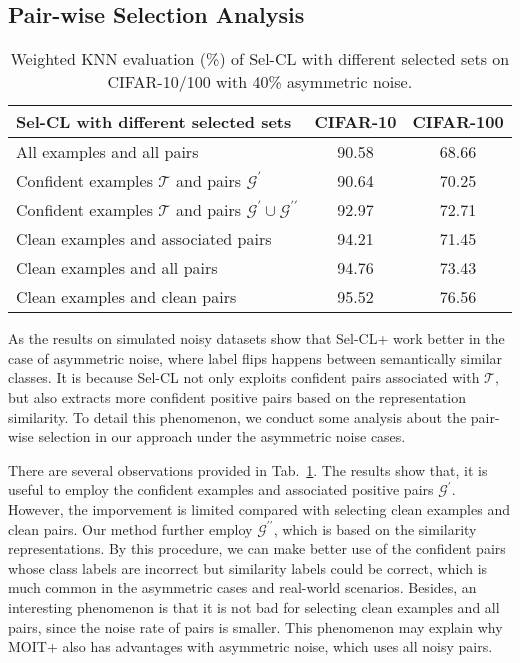 \documentclass[10pt,twocolumn,letterpaper]{article}
\begin{document}
\subsection{Pair-wise Selection Analysis}\label{sec:4.4}

\begin{table}[t]
	\caption{Weighted KNN evaluation (\%) of Sel-CL with different selected sets on CIFAR-10/100 with 40\% asymmetric noise. }
	\centering
	\footnotesize
	\setlength\tabcolsep{4pt}
	\begin{tabular}{l|c|c}
		\hline
		Sel-CL with different selected sets & CIFAR-10 & CIFAR-100 \\
		\hline  { All examples and all pairs}  & 90.58 & 68.66 \\
		\hline
		{ Confident examples $\mathcal{T}$ and pairs $\mathcal{G}^{\prime}$ }  & 90.64 & 70.25 \\
		{ Confident examples $\mathcal{T}$ and pairs $\mathcal{G}^{\prime} \cup \mathcal{G}^{\prime\prime}$ }  & 92.97 & 72.71 \\
		\hline
		{ Clean examples and associated pairs }  & 94.21 & 71.45 \\
		{ Clean examples and all pairs }    & 94.76 & 73.43 \\		
		{ Clean examples and clean pairs }  & 95.52 & 76.56\\
		\hline
	\end{tabular}
	\label{select}
	\vspace{-5pt}
\end{table}

As the results on simulated noisy datasets show that Sel-CL+ work better in the case of asymmetric noise, where label flips happens between semantically similar classes. It is because Sel-CL not only exploits confident pairs associated with $\mathcal{T}$, but also extracts more confident positive pairs based on the representation similarity. To detail this phenomenon, we conduct some analysis about the pair-wise selection in our approach under the asymmetric noise cases. 

There are several observations provided in Tab.~\ref{select}. The results show that, it is useful to employ the confident examples and associated positive pairs $\mathcal{G}^{\prime}$. However, the imporvement is limited compared with selecting clean examples and clean pairs. Our method further employ $\mathcal{G}^{\prime\prime}$, which is based on the similarity representations. By this procedure, we can make better use of the confident pairs whose class labels are incorrect but similarity labels could be correct, which is much common in the asymmetric cases and real-world scenarios. Besides, an interesting phenomenon is that it is not bad for selecting clean examples and all pairs, since the noise rate of pairs is smaller. This phenomenon may explain why MOIT+ also has advantages with asymmetric noise, which uses all noisy pairs. 
\end{document}
